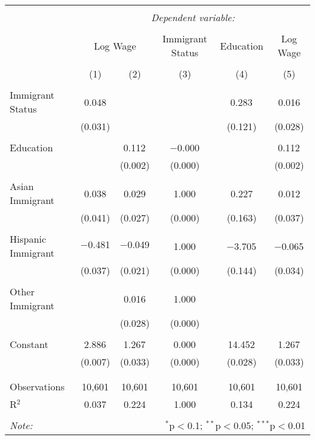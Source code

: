 \documentclass{article}
\begin{document}
\begin{table}[!htbp] \centering 
  \caption{} 
  \label{} 
\begin{tabular}{@{\extracolsep{5pt}}lccccc} 
\\[-1.8ex]\hline 
\hline \\[-1.8ex] 
 & \multicolumn{5}{c}{\textit{Dependent variable:}} \\ 
\cline{2-6} 
\\[-1.8ex] & \multicolumn{2}{c}{Log Wage} & Immigrant Status & Education & Log Wage \\ 
\\[-1.8ex] & (1) & (2) & (3) & (4) & (5)\\ 
\hline \\[-1.8ex] 
 Immigrant Status & 0.048 &  &  & 0.283$^{}$ & 0.016 \\ 
  & (0.031) &  &  & (0.121) & (0.028) \\ 
  & & & & & \\ 
 Education &  & 0.112$^{}$ & $-$0.000$^{}$ &  & 0.112$^{}$ \\ 
  &  & (0.002) & (0.000) &  & (0.002) \\ 
  & & & & & \\ 
 Asian Immigrant & 0.038 & 0.029 & 1.000$^{}$ & 0.227 & 0.012 \\ 
  & (0.041) & (0.027) & (0.000) & (0.163) & (0.037) \\ 
  & & & & & \\ 
 Hispanic Immigrant & $-$0.481$^{}$ & $-$0.049$^{}$ & 1.000$^{}$ & $-$3.705$^{}$ & $-$0.065$^{}$ \\ 
  & (0.037) & (0.021) & (0.000) & (0.144) & (0.034) \\ 
  & & & & & \\ 
 Other Immigrant &  & 0.016 & 1.000$^{}$ &  &  \\ 
  &  & (0.028) & (0.000) &  &  \\ 
  & & & & & \\ 
 Constant & 2.886$^{}$ & 1.267$^{}$ & 0.000$^{}$ & 14.452$^{}$ & 1.267$^{}$ \\ 
  & (0.007) & (0.033) & (0.000) & (0.028) & (0.033) \\ 
  & & & & & \\ 
\hline \\[-1.8ex] 
Observations & 10,601 & 10,601 & 10,601 & 10,601 & 10,601 \\ 
R$^{2}$ & 0.037 & 0.224 & 1.000 & 0.134 & 0.224 \\ 
\hline 
\hline \\[-1.8ex] 
\textit{Note:}  & \multicolumn{5}{r}{$^{*}$p$<$0.1; $^{**}$p$<$0.05; $^{***}$p$<$0.01} \\ 
\end{tabular} 
\end{table} 
\end{document}
